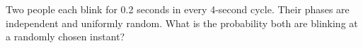 Two people each blink for 0.2 seconds in every 4-second cycle. Their phases are independent and uniformly random. What is the probability both are blinking at a randomly chosen instant?
